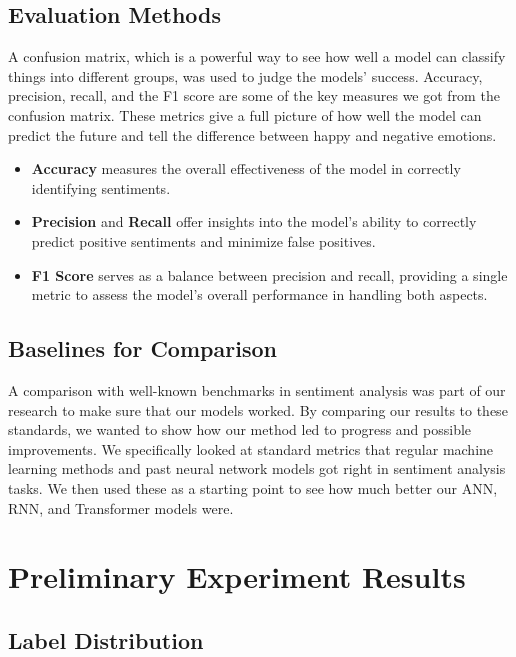 \documentclass[11pt,a4paper]{article}
\begin{document}
\subsection{Evaluation Methods}

A confusion matrix, which is a powerful way to see how well a model can classify things into different groups, was used to judge the models' success. Accuracy, precision, recall, and the F1 score are some of the key measures we got from the confusion matrix. These metrics give a full picture of how well the model can predict the future and tell the difference between happy and negative emotions.

\begin{itemize}
    \item \textbf{Accuracy} measures the overall effectiveness of the model in correctly identifying sentiments.
    \item \textbf{Precision} and \textbf{Recall} offer insights into the model's ability to correctly predict positive sentiments and minimize false positives.
    \item \textbf{F1 Score} serves as a balance between precision and recall, providing a single metric to assess the model's overall performance in handling both aspects.
\end{itemize}

\subsection{Baselines for Comparison}
A comparison with well-known benchmarks in sentiment analysis was part of our research to make sure that our models worked. By comparing our results to these standards, we wanted to show how our method led to progress and possible improvements. We specifically looked at standard metrics that regular machine learning methods and past neural network models got right in sentiment analysis tasks. We then used these as a starting point to see how much better our ANN, RNN, and Transformer models were.


\section{Preliminary Experiment Results}

\subsection{Label Distribution}
\end{document}
